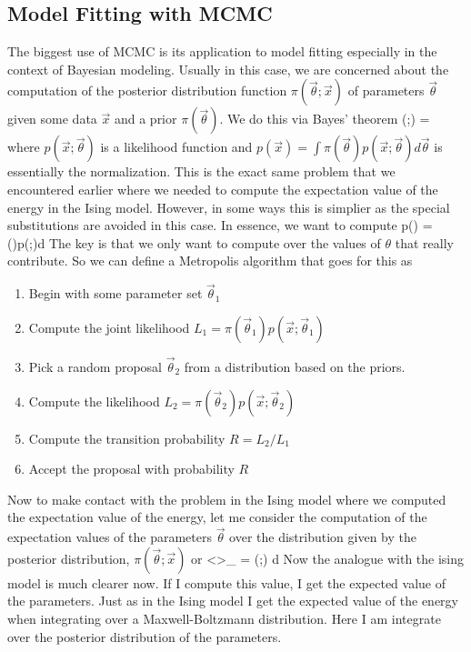 \subsection{Model Fitting with MCMC}

The biggest use of MCMC is its application to model fitting especially in the context of Bayesian modeling.  Usually in this case, we are concerned about the computation of the posterior distribution function $\pi(\vec{\theta};\vec{x})$ of parameters $\vec{\theta}$ given some data $\vec{x}$ and a prior $\pi(\vec{\theta})$.  We do this via Bayes' theorem
\be
\pi(\vec{\theta};) = 
\ee
where $p(\vec{x};\vec{\theta})$ is a likelihood function and $p(\vec{x}) = \int \pi(\vec{\theta})p(\vec{x};\vec{\theta})d\vec{\theta}$ is essentially the normalization.  This is the exact same problem that we encountered earlier where we needed to compute the expectation value of the energy in the Ising model.  However, in some ways this is simplier as the special substitutions are avoided in this case.  In essence, we want to compute
\be
p() = \int \pi(\vec{\theta})p(;\vec{\theta})d\vec{\theta}
\ee
The key is that we only want to compute over the values of $\theta$ that really contribute.  So we can define a Metropolis algorithm that goes for this as
\begin{enumerate}
    \item Begin with some parameter set $\vec{\theta}_1$ 
    \item Compute the joint likelihood $L_1 = \pi(\vec{\theta}_1)p(\vec{x};\vec{\theta}_1)$
    \item Pick a random proposal $\vec{\theta}_2$ from a distribution based on the priors.
    \item Compute the likelihood $L_2 = \pi(\vec{\theta}_2)p(\vec{x};\vec{\theta}_2)$
    \item Compute the transition probability $R = L_2/L_1$
    \item Accept the proposal with probability $R$
\end{enumerate}

Now to make contact with the problem in the Ising model where we computed the expectation value of the energy, let me consider the computation of the expectation values of the parameters $\vec{\theta}$ over the distribution given by the posterior distribution, $\pi(\vec{\theta};\vec{x})$ or
\be
\left<\vec{\theta}\right>_{\pi} = \int \vec{\theta}\pi(\vec{\theta};) d\vec{\theta} 
\ee
Now the analogue with the ising model is much clearer now.  If I compute this value, I get the expected value of the parameters.  Just as in the Ising model I get the expected value of the energy when integrating over a Maxwell-Boltzmann distribution.  Here I am integrate over the posterior distribution of the parameters.  

